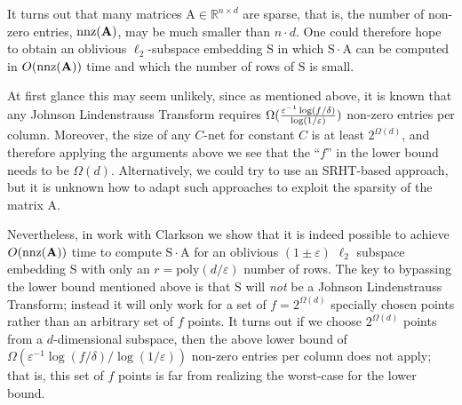 \documentclass[11pt]{article}
\newcommand{\mat}[1]{{\ensuremath{\bm{\mathrm{#1}}}}}
\def\matA{\mat{A}}
\def\matS{\mat{S}}
\def\nnz{{ \rm nnz }}
\def\frac#1#2{{#1\over #2}}
\newcommand{\eps}{\varepsilon}
\newcommand{\poly}{{\mathrm{poly}}}
\begin{document}
It turns out that many matrices $\matA \in \mathbb{R}^{n \times d}$ are sparse, 
that is, the number of non-zero entries, $\nnz(\matA)$, may be much smaller than $n \cdot d$. One could therefore
hope to obtain an oblivious $\ell_2$-subspace embedding $\matS$ in which $\matS \cdot \matA$ can be computed 
in $O(\nnz(\matA))$
time and which the number of rows of $\matS$ is small. 

At first glance this may seem unlikely, since as mentioned
above, it is known that any Johnson Lindenstrauss Transform requires 
$\Omega(\frac{\eps^{-1} \log(f/\delta)}{\log(1/\varepsilon)})$  non-zero entries per column. Moreover, the size of any $C$-net
for constant $C$ is at least $2^{\Omega(d)}$, and therefore applying the arguments above we see that the ``$f$'' in 
the lower bound needs to be $\Omega(d)$. Alternatively, we could try to use an SRHT-based approach, but 
it is unknown how to adapt such approaches to exploit the sparsity of the matrix $\matA$. 

Nevertheless, in work with Clarkson \cite{CW13} we show that it is indeed possible to achieve $O(\nnz(\matA))$ time to
compute $\matS \cdot \matA$ for an oblivious $(1 \pm \eps)$ $\ell_2$ 
subspace embedding $\matS$ with only an $r = \poly(d/\eps)$
number of rows. The key to bypassing the lower bound mentioned above is that $\matS$ will {\it not} be a Johnson
Lindenstrauss Transform; instead it will only work for a set of $f = 2^{\Omega(d)}$ specially chosen points rather
than an arbitrary set of $f$ points. It turns out if we choose $2^{\Omega(d)}$ points from a $d$-dimensional subspace,
then the above lower bound of $\Omega(\eps^{-1} \log(f/\delta)/\log(1/\varepsilon))$ non-zero entries per column
does not apply; that is, this set of $f$ points is far from realizing the worst-case for the lower bound. 
\end{document}
